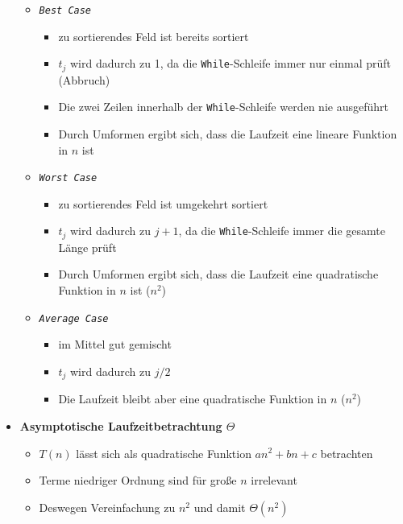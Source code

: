 \documentclass[
    12pt,
    a4paper,
    ngerman,
    color=3b,%
    marginpar=false,
    colorback=false,
    leqno,
]{tudaexercise}
\begin{document}
\begin{itemize}
\begin{itemize}
              \item \textit{\texttt{Best Case}}
                    \begin{itemize}
                        \item zu sortierendes Feld ist bereits sortiert
                        \item $t_j$ wird dadurch zu 1, da die \texttt{While}-Schleife immer nur einmal prüft (Abbruch)
                        \item Die zwei Zeilen innerhalb der \texttt{While}-Schleife werden nie ausgeführt
                        \item Durch Umformen ergibt sich, dass die Laufzeit eine lineare Funktion in $n$ ist
                    \end{itemize}

              \item \textit{\texttt{Worst Case}}
                    \begin{itemize}
                        \item zu sortierendes Feld ist umgekehrt sortiert
                        \item $t_j$ wird dadurch zu $j+1$, da die \texttt{While}-Schleife immer die gesamte Länge prüft
                        \item Durch Umformen ergibt sich, dass die Laufzeit eine quadratische Funktion in $n$ ist ($n^2$)
                    \end{itemize}

              \item \textit{\texttt{Average Case} }
                    \begin{itemize}
                        \item im Mittel gut gemischt
                        \item $t_j$ wird dadurch zu $j/2$
                        \item Die Laufzeit bleibt aber eine quadratische Funktion in $n$ ($n^2$)
                    \end{itemize}
          \end{itemize}

    \item \textbf{Asymptotische Laufzeitbetrachtung $\Theta$} {\label{insSortLaufzeitTheta}}
          \begin{itemize}
              \item $T(n)$ lässt sich als quadratische Funktion $an^2 + bn + c$ betrachten
              \item Terme niedriger Ordnung sind für gro\ss e $n$ irrelevant
              \item Deswegen Vereinfachung zu $n^2$ und damit $\Theta(n^2)$
          \end{itemize}
\end{itemize}
\clearpage
\end{document}
